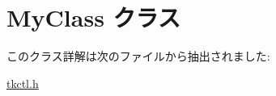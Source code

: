 \hypertarget{class_my_class}{}\section{My\+Class クラス}
\label{class_my_class}


このクラス詳解は次のファイルから抽出されました\+:\begin{DoxyCompactItemize}
\item 
\hyperlink{tkctl_8h}{tkctl.\+h}\end{DoxyCompactItemize}
